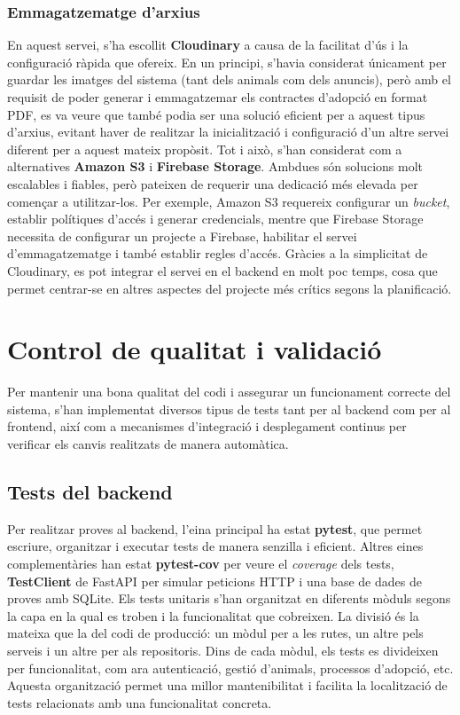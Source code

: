 \documentclass[11pt,a4paper]{report}
\begin{document}
\subsubsection{Emmagatzematge d'arxius}
En aquest servei, s'ha escollit \textbf{Cloudinary} a causa de la facilitat d'ús i la configuració ràpida que ofereix. En un principi, s'havia considerat únicament per guardar les imatges del sistema (tant dels animals com dels anuncis), però amb el requisit de poder generar i emmagatzemar els contractes d'adopció en format PDF, es va veure que també podia ser una solució eficient per a aquest tipus d'arxius, evitant haver de realitzar la inicialització i configuració d'un altre servei diferent per a aquest mateix propòsit.
Tot i això, s'han considerat com a alternatives \textbf{Amazon S3} i \textbf{Firebase Storage}. Ambdues són solucions molt escalables i fiables, però pateixen de requerir una dedicació més elevada per començar a utilitzar-los. Per exemple, Amazon S3 requereix configurar un \textit{bucket}, establir polítiques d'accés i generar credencials, mentre que Firebase Storage necessita de configurar un projecte a Firebase, habilitar el servei d'emmagatzematge i també establir regles d'accés. Gràcies a la simplicitat de Cloudinary, es pot integrar el servei en el backend en molt poc temps, cosa que permet centrar-se en altres aspectes del projecte més crítics segons la planificació.

\newpage
\section{Control de qualitat i validació}
Per mantenir una bona qualitat del codi i assegurar un funcionament correcte del sistema, s'han implementat diversos tipus de tests tant per al backend com per al frontend, així com a mecanismes d'integració i desplegament continus per verificar els canvis realitzats de manera automàtica.

\subsection{Tests del backend}
Per realitzar proves al backend, l'eina principal ha estat \textbf{pytest}, que permet escriure, organitzar i executar tests de manera senzilla i eficient. Altres eines complementàries han estat \textbf{pytest-cov} per veure el \textit{coverage} dels tests, \textbf{TestClient} de FastAPI per simular peticions HTTP i una base de dades de proves amb SQLite.
Els tests unitaris s'han organitzat en diferents mòduls segons la capa en la qual es troben i la funcionalitat que cobreixen. La divisió és la mateixa que la del codi de producció: un mòdul per a les rutes, un altre pels serveis i un altre per als repositoris. Dins de cada mòdul, els tests es divideixen per funcionalitat, com ara autenticació, gestió d'animals, processos d'adopció, etc. Aquesta organització permet una millor mantenibilitat i facilita la localització de tests relacionats amb una funcionalitat concreta.
\end{document}
